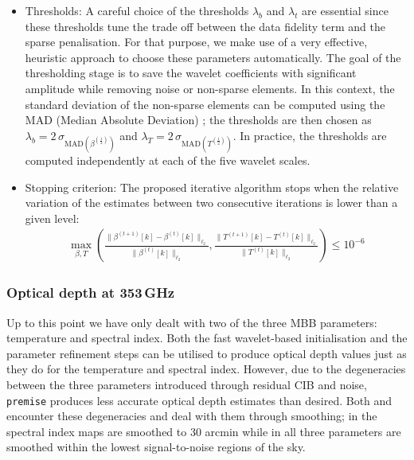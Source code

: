 \documentclass[a4paper,fleqn,usenatbib]{mnras}
\begin{document}
\begin{itemize}
\begin{itemize}
\item{Thresholds:} A careful choice of the thresholds $\lambda_b$ and $\lambda_t$ are essential since these thresholds tune the trade off between the data fidelity term and the sparse penalisation. For that purpose, we make use of a very effective, heuristic approach to choose these parameters automatically. The goal of the thresholding stage is to save the wavelet coefficients with significant amplitude while removing noise or non-sparse elements. In this context, the standard deviation of the non-sparse elements can be computed using the MAD (Median Absolute Deviation) \citep{starck2010sparse}; the thresholds are then chosen as $\lambda_b = 2\, \sigma_{\mbox{MAD}(\beta^{(\frac{1}{2})})}$ and $\lambda_T = 2 \, \sigma_{\mbox{MAD}(T^{(\frac{1}{2})})}$. In practice, the thresholds are computed independently at each of the five wavelet scales. \\

\item{Stopping criterion:}	The proposed iterative algorithm stops when the relative variation of the estimates between two consecutive iterations is lower than a given level: 
\begin{eqnarray}
 \max_{\beta,T} \left(  \frac{\|\beta^{(t+1)}[k] - \beta^{(t)}[k] \|_{\ell_2}}{\|\beta^{(t)}[k] \|_{\ell_2}},   \frac{\|T^{(t+1)}[k] - T^{(t)}[k] \|_{\ell_2}}{\|T^{(t)}[k] \|_{\ell_2}}   \right) \leq 10^{-6} \nonumber
\end{eqnarray}
\end{itemize}

\end{itemize}

\subsubsection{Optical depth at 353\,GHz}

Up to this point we have only dealt with two of the three MBB parameters: temperature and spectral index. Both the fast wavelet-based initialisation and the parameter refinement steps can be utilised to produce optical depth values just as they do for the temperature and spectral index. However, due to the degeneracies between the three parameters introduced through residual CIB and noise, {\texttt{premise}} produces less accurate optical depth estimates than desired. Both \citet{pr2} and \citet{gnilc} encounter these degeneracies and deal with them through smoothing; in \citet{pr2} the spectral index maps are smoothed to 30 arcmin while in \citet{gnilc} all three parameters are smoothed within the lowest signal-to-noise regions of the sky. 
\end{document}
